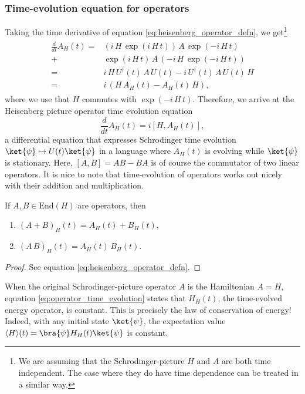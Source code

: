 \subsubsection{Time-evolution equation for operators}
Taking the time derivative of equation \ref{eq:heisenberg_operator_defn}, we get\footnote{We are assuming that the Schrodinger-picture $H$ and $A$ are both time independent. The case where they do have time dependence can be treated in a similar way.}
\begin{align*} \begin{split}
    \frac{d}{dt}A_H(t) = &\left(i \, H \, \exp(i \, H \, t)\right) \, A \, \exp(-i \, H \, t)\\
    + &\exp(i \, H \, t) \, A \, \left(-i \, H \, \exp(-i \, H \, t)\right)\\
     = &i \, H \, U^\dag(t) \, A \, U(t)
    - i \, U^\dag(t) \, A \, U(t) \, H\\
    =& i \, \left(H \, A_H(t) - A_H(t) \, H \right),
\end{split} \end{align*}
where we use that $H$ commutes with $\exp(-i \, H \, t)$. Therefore, we arrive at the Heisenberg picture operator time evolution equation
\begin{equation} \label{eq:operator_time_evolution}
    \boxed{\frac{d}{dt} A_H(t) = i \left[H, A_H(t)\right],}
\end{equation}
a differential equation that expresses Schrodinger time evolution $\ket{\psi} \mapsto U(t) \ket{\psi}$ in a language where $A_H(t)$ is evolving while $\ket{\psi}$ is stationary. Here, $[A, B] = A B - B A$ is of course the commutator of two linear operators. It is nice to note that time-evolution of operators works out nicely with their addition and multiplication.
\begin{proposition} \label{prop:op_time_evolution_add_mult}
If $A, B \in \text{End}(H)$ are operators, then
\begin{enumerate}
    \item $(A + B)_H(t) = A_H(t) + B_H(t)$,
    \item $(A \, B)_H(t) = A_H(t) \, B_H(t)$.
\end{enumerate}
\end{proposition}
\begin{proof}
See equation \ref{eq:heisenberg_operator_defn}.
\end{proof}

\begin{remark} \label{rem:time_evolution_energy}
When the original Schrodinger-picture operator $A$ is the Hamiltonian $A = H$, equation \ref{eq:operator_time_evolution} states that $H_H(t)$, the time-evolved energy operator, is constant. This is precisely the law of conservation of energy! Indeed, with any initial state $\ket{\psi}$, the expectation value $\langle H \rangle(t) = \bra{\psi} H_H(t) \ket{\psi}$ is constant.
\end{remark}

